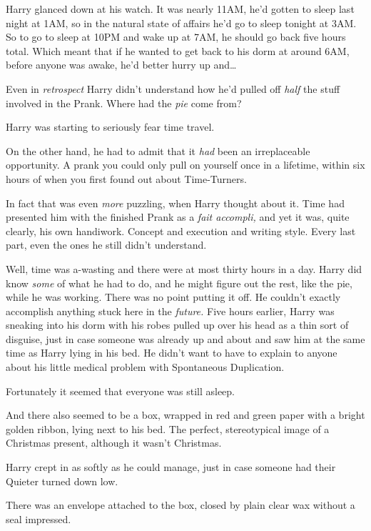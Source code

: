 Harry glanced down at his watch. It was nearly 11AM, he'd gotten to sleep last 
night at 1AM, so in the natural state of affairs he'd go to sleep tonight at 
3AM. So to go to sleep at 10PM and wake up at 7AM, he should go back five hours 
total. Which meant that if he wanted to get back to his dorm at around 6AM, 
before anyone was awake, he'd better hurry up and{\ldots}

Even in \emph{retrospect} Harry didn't understand how he'd pulled off 
\emph{half} the stuff involved in the Prank. Where had the \emph{pie} come from?

Harry was starting to seriously fear time travel.

On the other hand, he had to admit that it \emph{had} been an irreplaceable 
opportunity. A prank you could only pull on yourself once in a lifetime, within 
six hours of when you first found out about Time-Turners.

In fact that was even \emph{more} puzzling, when Harry thought about it. Time 
had presented him with the finished Prank as a \emph{fait accompli,} and yet it 
was, quite clearly, his own handiwork. Concept and execution and writing style. 
Every last part, even the ones he still didn't understand.

Well, time was a-wasting and there were at most thirty hours in a day. Harry 
did know \emph{some} of what he had to do, and he might figure out the rest, 
like the pie, while he was working. There was no point putting it off. He 
couldn't exactly accomplish anything stuck here in the \emph{future.}
\sbreak
Five hours earlier, Harry was sneaking into his dorm with his robes pulled up 
over his head as a thin sort of disguise, just in case someone was already up 
and about and saw him at the same time as Harry lying in his bed. He didn't 
want to have to explain to anyone about his little medical problem with 
Spontaneous Duplication.

Fortunately it seemed that everyone was still asleep.

And there also seemed to be a box, wrapped in red and green paper with a bright 
golden ribbon, lying next to his bed. The perfect, stereotypical image of a 
Christmas present, although it wasn't Christmas.

Harry crept in as softly as he could manage, just in case someone had their 
Quieter turned down low.

There was an envelope attached to the box, closed by plain clear wax without a 
seal impressed.

